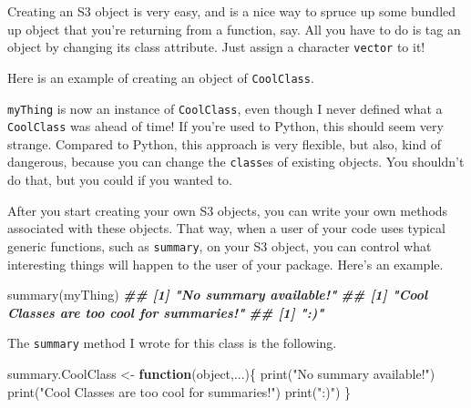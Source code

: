 \documentclass[
  12pt,
]{krantz}
\makeatletter
\newenvironment{Shaded}{\begin{snugshade}}{\end{snugshade}}
\newcommand{\CommentTok}[1]{\textcolor[rgb]{0.37,0.37,0.37}{\textit{#1}}}
\newcommand{\ControlFlowTok}[1]{\textcolor[rgb]{0.27,0.27,0.27}{\textbf{#1}}}
\newcommand{\DecValTok}[1]{\textcolor[rgb]{0.06,0.06,0.06}{#1}}
\newcommand{\DocumentationTok}[1]{\textcolor[rgb]{0.37,0.37,0.37}{\textbf{\textit{#1}}}}
\newcommand{\FunctionTok}[1]{\textcolor[rgb]{0,0,0}{#1}}
\newcommand{\NormalTok}[1]{#1}
\newcommand{\OtherTok}[1]{\textcolor[rgb]{0.37,0.37,0.37}{#1}}
\newcommand{\SpecialCharTok}[1]{\textcolor[rgb]{0,0,0}{#1}}
\newcommand{\StringTok}[1]{\textcolor[rgb]{0.5,0.5,0.5}{#1}}
\newenvironment{kframe}{%
\medskip{}
\setlength{\fboxsep}{.8em}
 \def\at@end@of@kframe{}%
 \ifinner\ifhmode%
  \def\at@end@of@kframe{\end{minipage}}%
  \begin{minipage}{\columnwidth}%
 \fi\fi%
 \def\FrameCommand##1{\hskip\@totalleftmargin \hskip-\fboxsep
 \colorbox{shadecolor}{##1}\hskip-\fboxsep
     \hskip-\linewidth \hskip-\@totalleftmargin \hskip\columnwidth}%
 \MakeFramed {\advance\hsize-\width
   \@totalleftmargin\z@ \linewidth\hsize
   \@setminipage}}%
 {\par\unskip\endMakeFramed%
 \at@end@of@kframe}
\renewenvironment{Shaded}{\begin{kframe}}{\end{kframe}}
\makeatother
\begin{document}
Creating an S3 object is very easy, and is a nice way to spruce up some bundled up object that you're returning from a function, say. All you have to do is tag an object by changing its class attribute. Just assign a character \texttt{vector} to it!

Here is an example of creating an object of \texttt{CoolClass}.

\begin{Shaded}
\end{Shaded}

\texttt{myThing} is now an instance of \texttt{CoolClass}, even though I never defined what a \texttt{CoolClass} was ahead of time! If you're used to Python, this should seem very strange. Compared to Python, this approach is very flexible, but also, kind of dangerous, because you can change the \texttt{class}es of existing objects. You shouldn't do that, but you could if you wanted to.

After you start creating your own S3 objects, you can write your own methods associated with these objects. That way, when a user of your code uses typical generic functions, such as \texttt{summary}, on your S3 object, you can control what interesting things will happen to the user of your package. Here's an example.

\begin{Shaded}
\begin{Highlighting}[]
\FunctionTok{summary}\NormalTok{(myThing)}
\DocumentationTok{\#\# [1] "No summary available!"}
\DocumentationTok{\#\# [1] "Cool Classes are too cool for summaries!"}
\DocumentationTok{\#\# [1] ":)"}
\end{Highlighting}
\end{Shaded}

The \texttt{summary} method I wrote for this class is the following.

\begin{Shaded}
\begin{Highlighting}[]
\NormalTok{summary.CoolClass }\OtherTok{\textless{}{-}} \ControlFlowTok{function}\NormalTok{(object,...)\{}
  \FunctionTok{print}\NormalTok{(}\StringTok{"No summary available!"}\NormalTok{)}
  \FunctionTok{print}\NormalTok{(}\StringTok{"Cool Classes are too cool for summaries!"}\NormalTok{)}
  \FunctionTok{print}\NormalTok{(}\StringTok{":)"}\NormalTok{)}
\NormalTok{\}}
\end{Highlighting}
\end{Shaded}
\end{document}
